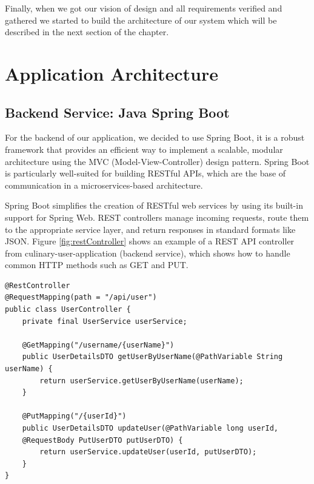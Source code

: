 Finally, when we got our vision of design and all requirements verified and gathered we started to build the architecture of our system which will be described in the next section of the chapter.

\section{Application Architecture}


\subsection{Backend Service: Java Spring Boot}\label{subsec:Backend Service: Java Spring Boot}

For the backend of our application, we decided to use Spring Boot, it is a robust framework that provides an efficient way to implement a scalable, modular architecture using the MVC (Model-View-Controller) design pattern. Spring Boot is particularly well-suited for building RESTful APIs, which are the base of communication in a microservices-based architecture. 

Spring Boot simplifies the creation of RESTful web services by using its built-in support for Spring Web. REST controllers manage incoming requests, route them to the appropriate service layer, and return responses in standard formats like JSON. Figure \ref{fig:restController} shows an example of a REST API controller from culinary-user-application (backend service), which shows how to handle common HTTP methods such as GET and PUT.
\renewcommand\theFancyVerbLine{\large\arabic{FancyVerbLine}}
{
\begin{verbatim}
@RestController
@RequestMapping(path = "/api/user")
public class UserController {
    private final UserService userService;

    @GetMapping("/username/{userName}")
    public UserDetailsDTO getUserByUserName(@PathVariable String userName) {
        return userService.getUserByUserName(userName);
    }

    @PutMapping("/{userId}")
    public UserDetailsDTO updateUser(@PathVariable long userId, 
    @RequestBody PutUserDTO putUserDTO) {
        return userService.updateUser(userId, putUserDTO);
    }
}
\end{verbatim}
\label{fig:restController}
}

